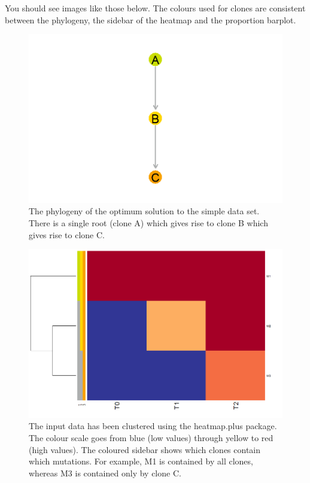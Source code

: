 \documentclass{article}
\begin{document}
You should see images like those below.  The colours used for clones are consistent between the phylogeny, the sidebar of the heatmap and the proportion barplot.

\begin{figure}[H]
    \centering
    \includegraphics{gaga_simple_data_phylogeny.png}
    \caption{The phylogeny of the optimum solution to the simple data set.  There is a single root (clone A) which gives rise to clone B which gives rise to clone C.}
\end{figure}

\begin{figure}[H]
   \centering
       \includegraphics{gaga_simple_data_heatmap}
   \caption{The input data has been clustered using the heatmap.plus package.  The colour scale goes from blue (low values) through yellow to red (high values).
   The coloured sidebar shows which clones contain which mutations.  For example, M1 is contained by all clones, whereas M3 is contained only by clone C.}
\end{figure}
\end{document}
